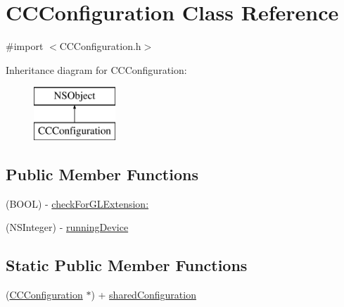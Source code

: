 \hypertarget{interface_c_c_configuration}{\section{C\-C\-Configuration Class Reference}
\label{interface_c_c_configuration}
}


{\ttfamily \#import $<$C\-C\-Configuration.\-h$>$}

Inheritance diagram for C\-C\-Configuration\-:\begin{figure}[H]
\begin{center}
\leavevmode
\includegraphics[height=2.000000cm]{interface_c_c_configuration}
\end{center}
\end{figure}
\subsection*{Public Member Functions}
\begin{DoxyCompactItemize}
\item 
(B\-O\-O\-L) -\/ \hyperlink{interface_c_c_configuration_ad2e12cee4ed69634622b1626246b4554}{check\-For\-G\-L\-Extension\-:}
\item 
(N\-S\-Integer) -\/ \hyperlink{interface_c_c_configuration_ab1ab1c7d201f2a403b53ec526e7246a5}{running\-Device}
\end{DoxyCompactItemize}
\subsection*{Static Public Member Functions}
\begin{DoxyCompactItemize}
\item 
(\hyperlink{interface_c_c_configuration}{C\-C\-Configuration} $\ast$) + \hyperlink{interface_c_c_configuration_ac72a28a648a05b877378ef484aa4ffd8}{shared\-Configuration}
\end{DoxyCompactItemize}
